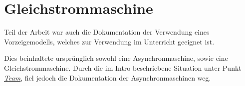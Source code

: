 \chapter{Gleichstrommaschine}

Teil der Arbeit war auch die Dokumentation der Verwendung eines Vorzeigemodells, welches zur Verwendung im Unterricht geeignet ist.

Dies beinhaltete ursprünglich sowohl eine Asynchronmaschine, sowie eine Gleichstrommaschine.
Durch die im Intro beschriebene Situation unter Punkt \hyperref[team]{\textit{Team}}, fiel jedoch die Dokumentation der Asynchronmaschinen weg.